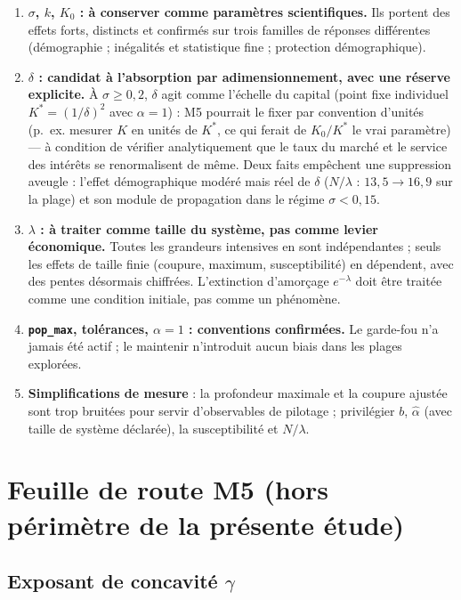 \documentclass[11pt,a4paper]{article}
\newcommand{\code}[1]{\texttt{#1}}
\begin{document}
\begin{enumerate}
\item \textbf{$\sigma$, $k$, $K_0$ : à conserver comme paramètres
  scientifiques.} Ils portent des effets forts, distincts et
  confirmés sur trois familles de réponses différentes (démographie ;
  inégalités et statistique fine ; protection démographique).
\item \textbf{$\delta$ : candidat à l'absorption par adimensionnement,
  avec une réserve explicite.} À $\sigma\ge0{,}2$, $\delta$ agit comme
  l'échelle du capital (point fixe individuel $K^\ast=(1/\delta)^2$
  avec $\alpha=1$) : M5 pourrait le fixer par convention d'unités
  (p.~ex. mesurer $K$ en unités de $K^\ast$, ce qui ferait de
  $K_0/K^\ast$ le vrai paramètre) — à condition de vérifier
  analytiquement que le taux du marché et le service des intérêts se
  renormalisent de même. Deux faits empêchent une suppression
  aveugle : l'effet démographique modéré mais réel de $\delta$
  ($N/\lambda$ : $13{,}5\to16{,}9$ sur la plage) et son module de
  propagation dans le régime $\sigma<0{,}15$.
\item \textbf{$\lambda$ : à traiter comme taille du système, pas comme
  levier économique.} Toutes les grandeurs intensives en sont
  indépendantes ; seuls les effets de taille finie (coupure, maximum,
  susceptibilité) en dépendent, avec des pentes désormais chiffrées.
  L'extinction d'amorçage $e^{-\lambda}$ doit être traitée comme une
  condition initiale, pas comme un phénomène.
\item \textbf{\code{pop\_max}, tolérances, $\alpha=1$ : conventions
  confirmées.} Le garde-fou n'a jamais été actif ; le maintenir
  n'introduit aucun biais dans les plages explorées.
\item \textbf{Simplifications de mesure} : la profondeur maximale et la
  coupure ajustée sont trop bruitées pour servir d'observables de
  pilotage ; privilégier $b$, $\hat\alpha$ (avec taille de système
  déclarée), la susceptibilité et $N/\lambda$.
\end{enumerate}

\section{Feuille de route M5 (hors périmètre de la présente étude)}
\label{sec:m5}

\subsection{Exposant de concavité $\gamma$}
\end{document}

